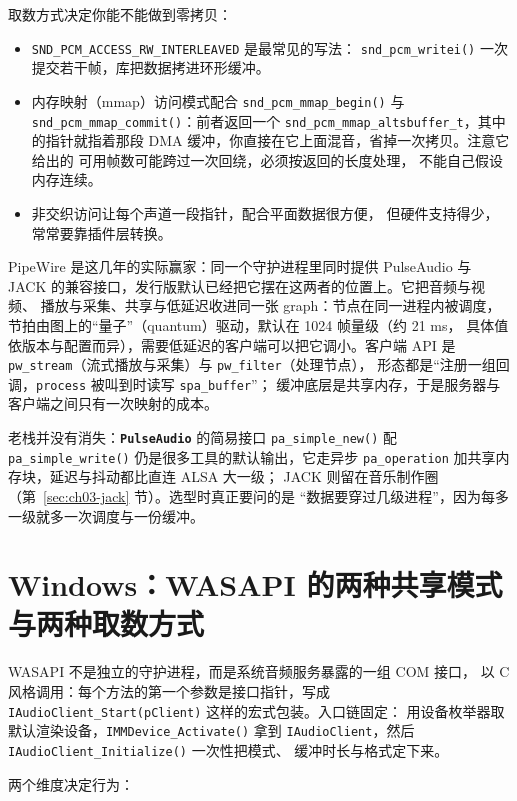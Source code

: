 \documentclass[12pt,a4paper,fontset=fandol]{ctexbook}
\newcommand{\Fn}[1]{\texttt{#1()}}
\newcommand{\Tp}[1]{\texttt{#1}}
\newcommand{\Lib}[1]{\textbf{\texttt{#1}}}
\newcommand{\Lang}[1]{\textsf{#1}}
\newcommand{\CL}{\Lang{C}}
\begin{document}
取数方式决定你能不能做到零拷贝：
\begin{itemize}
  \item \Tp{SND\_PCM\_ACCESS\_RW\_INTERLEAVED} 是最常见的写法：
        \Fn{snd\_pcm\_writei} 一次提交若干帧，库把数据拷进环形缓冲。
  \item 内存映射（mmap）访问模式配合 \Fn{snd\_pcm\_mmap\_begin}
        与 \Fn{snd\_pcm\_mmap\_commit}：前者返回一个
        \Tp{snd\_pcm\_mmap\_altsbuffer\_t}，其中的指针就指着那段
        DMA 缓冲，你直接在它上面混音，省掉一次拷贝。注意它给出的
        可用帧数可能跨过一次回绕，必须按返回的长度处理，
        不能自己假设内存连续。
  \item 非交织访问让每个声道一段指针，配合平面数据很方便，
        但硬件支持得少，常常要靠插件层转换。
\end{itemize}

PipeWire 是这几年的实际赢家：同一个守护进程里同时提供 PulseAudio 与
JACK 的兼容接口，发行版默认已经把它摆在这两者的位置上。它把音频与视频、
播放与采集、共享与低延迟收进同一张 graph：节点在同一进程内被调度，
节拍由图上的``量子''（quantum）驱动，默认在 1024 帧量级（约 21 ms，
具体值依版本与配置而异），需要低延迟的客户端可以把它调小。客户端 API 是
\Tp{pw\_stream}（流式播放与采集）与 \Tp{pw\_filter}（处理节点），
形态都是``注册一组回调，\Tp{process} 被叫到时读写 \Tp{spa\_buffer}''；
缓冲底层是共享内存，于是服务器与客户端之间只有一次映射的成本。

老栈并没有消失：\Lib{PulseAudio}{} 的简易接口 \Fn{pa\_simple\_new}
配 \Fn{pa\_simple\_write} 仍是很多工具的默认输出，它走异步
\Tp{pa\_operation} 加共享内存块，延迟与抖动都比直连 ALSA 大一级；
JACK 则留在音乐制作圈（第~\ref{sec:ch03-jack} 节）。选型时真正要问的是
``数据要穿过几级进程''，因为每多一级就多一次调度与一份缓冲。

\section{Windows：WASAPI 的两种共享模式与两种取数方式}
\label{sec:ch03-wasapi}

WASAPI 不是独立的守护进程，而是系统音频服务暴露的一组 COM 接口，
以 \CL{} 风格调用：每个方法的第一个参数是接口指针，写成
\Tp{IAudioClient\_Start(pClient)} 这样的宏式包装。入口链固定：
用设备枚举器取默认渲染设备，\Fn{IMMDevice\_Activate} 拿到
\Tp{IAudioClient}，然后 \Fn{IAudioClient\_Initialize} 一次性把模式、
缓冲时长与格式定下来。

两个维度决定行为：
\end{document}
